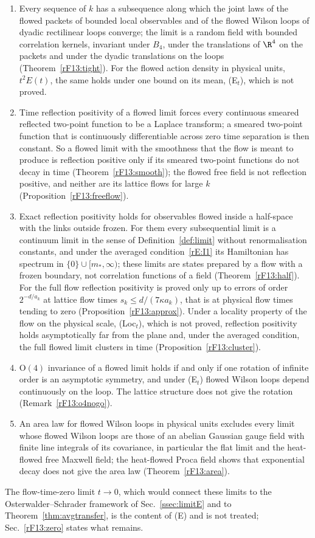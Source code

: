 \begin{enumerate}[label=\textup{(\alph*)},leftmargin=*]
\item Every sequence of $k$ has a subsequence along which the joint laws of
the flowed packets of bounded local observables and of the flowed Wilson
loops of dyadic rectilinear loops converge; the limit is a random field with
bounded correlation kernels, invariant under $B_4$, under the translations
of $\R^4$ on the packets and under the dyadic translations on the loops
(Theorem~\ref{rF13:tight}). For the flowed action density
in physical units, $t^2E(t)$, the same holds under one bound on its mean,
(E$_t$), which is not proved.
\item Time reflection positivity of a flowed limit forces every continuous
smeared reflected two-point function to be a Laplace transform; a smeared two-point
function that is continuously differentiable across zero time separation
is then constant. So a flowed limit with the smoothness that the flow is
meant to produce is reflection positive only if its smeared two-point
functions do not decay in time (Theorem~\ref{rF13:smooth}); the flowed free
field is not reflection positive, and neither are its lattice flows for
large $k$ (Proposition~\ref{rF13:freeflow}).
\item Exact reflection positivity holds for observables flowed inside a
half-space with the links outside frozen. For them every subsequential limit
is a continuum limit in the sense of Definition~\ref{def:limit} without
renormalisation constants, and under the averaged condition~\ref{rE:I1} its
Hamiltonian has spectrum in $\{0\}\cup[m_*,\infty)$; these limits are states
prepared by a flow with a frozen boundary, not correlation functions of a
field (Theorem~\ref{rF13:half}). For the full flow
reflection positivity is proved only up to errors of order $2^{-d/a_k}$ at lattice
flow times $s_k\le d/(7\kappa a_k)$, that is at physical flow times tending
to zero (Proposition~\ref{rF13:approx}). Under a locality property of the
flow on the physical scale, (Loc$_t$), which is not proved, reflection
positivity holds asymptotically far from the plane and, under the averaged
condition, the full flowed limit clusters in time
(Proposition~\ref{rF13:cluster}).
\item $\mathrm O(4)$ invariance of a flowed limit holds if and only if one
rotation of infinite order is an asymptotic symmetry, and under (E$_t$)
flowed Wilson loops depend continuously on the loop. The lattice structure
does not give the rotation (Remark~\ref{rF13:o4nogo}).
\item An area law for flowed Wilson loops in physical units excludes every
limit whose flowed Wilson loops are those of an abelian Gaussian gauge field
with finite line integrals of its covariance, in particular the flat limit
and the heat-flowed free Maxwell field; the heat-flowed Proca field shows
that exponential decay does not give the area law
(Theorem~\ref{rF13:area}).
\end{enumerate}
The flow-time-zero limit $t\to0$, which would connect these limits to the
Osterwalder--Schrader framework of Sec.~\ref{ssec:limitE} and to
Theorem~\ref{thm:avgtransfer}, is the content of (E) and is not treated;
Sec.~\ref{rF13:zero} states what remains.

